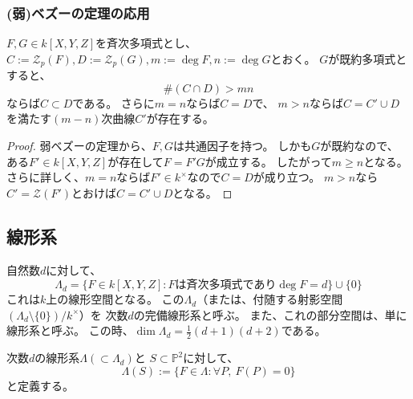 \documentclass[a4]{article}
\newcommand{\proj}{\mathbb{P}}
\begin{document}
        \subsubsection{(弱)ベズーの定理の応用}
        \begin{Prop}
            $F,G \in k[X,Y,Z]$を斉次多項式とし、
            $C:=\mathcal{Z}_p(F),D:=\mathcal{Z}_p(G),
            m:=\deg F, n:=\deg G$とおく。
            $G$が既約多項式とすると、
            \[ \#(C \cap D) > mn \]
            ならば$C \subset D$である。
            さらに$m=n$ならば$C=D$で、
            $m>n$ならば$C=C' \cup D$を満たす$(m-n)$次曲線$C'$が存在する。
        \end{Prop}
        \begin{proof}
            弱ベズーの定理から、$F,G$は共通因子を持つ。
            しかも$G$が既約なので、
            ある$F' \in k[X,Y,Z]$が存在して$F=F'G$が成立する。
            したがって$m \geq n$となる。
            さらに詳しく、$m=n$ならば$F' \in k^{\times}$なので$C=D$が成り立つ。
            $m>n$なら$C'=\mathcal{Z}(F')$とおけば$C=C' \cup D$となる。
            
        \end{proof}

        \subsection{線形系}
        自然数$d$に対して、
        \[ \Lambda_d=\{ F \in k[X,Y,Z] : \mbox{$F$は斉次多項式であり$\deg F=d$} \} \cup \{ 0 \} \]
        これは$k$上の線形空間となる。
        この$\Lambda_d$（または、付随する射影空間$(\Lambda_d \setminus \{0\})/k^{\times}$）を
        次数$d$の完備線形系と呼ぶ。
        また、これの部分空間は、単に線形系と呼ぶ。
        この時、$\dim \Lambda_d=\frac{1}{2}(d+1)(d+2)$である。

        次数$d$の線形系$\Lambda(\subset \Lambda_d)$と
        $S \subset \proj^2$に対して、
        \[ \Lambda(S):=\{ F \in \Lambda : \forall P,~F(P)=0 \} \]
        と定義する。
\end{document}
